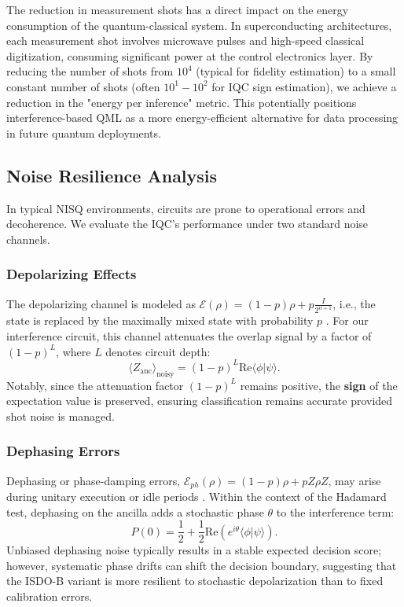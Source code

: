 \documentclass[conference]{IEEEtran}
\begin{document}
The reduction in measurement shots has a direct impact on the energy consumption of the quantum-classical system. In superconducting architectures, each measurement shot involves microwave pulses and high-speed classical digitization, consuming significant power at the control electronics layer. By reducing the number of shots from $10^4$ (typical for fidelity estimation) to a small constant number of shots (often $10^1-10^2$ for IQC sign estimation), we achieve a reduction in the "energy per inference" metric. This potentially positions interference-based QML as a more energy-efficient alternative for data processing in future quantum deployments.

\subsection{Noise Resilience Analysis}
In typical NISQ environments, circuits are prone to operational errors and decoherence. We evaluate the IQC's performance under two standard noise channels.

\subsubsection{Depolarizing Effects}
The depolarizing channel is modeled as $\mathcal{E}(\rho) = (1-p)\rho + p\frac{I}{2^{n+1}}$, i.e., the state is replaced by the maximally mixed state with probability $p$ \cite{nielsen2000qcqi}. For our interference circuit, this channel attenuates the overlap signal by a factor of $(1-p)^L$, where $L$ denotes circuit depth:
\begin{equation}
    \langle Z_{\text{anc}} \rangle_{\text{noisy}} = (1-p)^L \mathrm{Re}\langle \phi | \psi \rangle.
\end{equation}
Notably, since the attenuation factor $(1-p)^L$ remains positive, the \textbf{sign} of the expectation value is preserved, ensuring classification remains accurate provided shot noise is managed.

\subsubsection{Dephasing Errors}
Dephasing or phase-damping errors, $\mathcal{E}_{ph}(\rho) = (1-p)\rho + p Z\rho Z$, may arise during unitary execution or idle periods \cite{nielsen2000qcqi}. Within the context of the Hadamard test, dephasing on the ancilla adds a stochastic phase $\theta$ to the interference term:
\begin{equation}
    P(0) = \frac{1}{2} + \frac{1}{2} \text{Re}(e^{i\theta} \langle \phi | \psi \rangle).
\end{equation}
Unbiased dephasing noise typically results in a stable expected decision score; however, systematic phase drifts can shift the decision boundary, suggesting that the ISDO-B variant is more resilient to stochastic depolarization than to fixed calibration errors.
\end{document}
